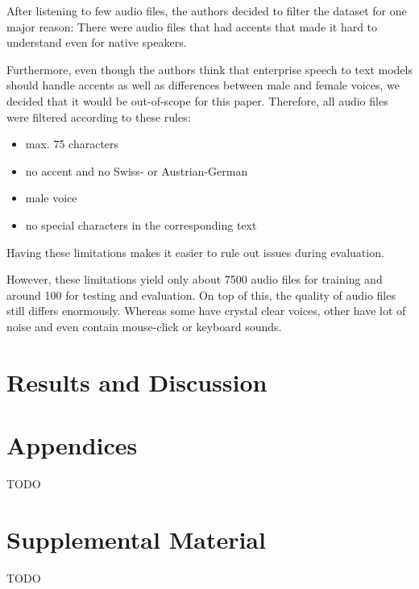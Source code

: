\documentclass[11pt,a4paper]{article}
\begin{document}
After listening to few audio files, the authors decided to filter the dataset for one major reason:
There were audio files that had accents that made it hard to understand even for native speakers.

Furthermore, even though the authors think that enterprise speech to text models
should handle accents as well as differences between male and female voices,
we decided that it would be out-of-scope for this paper.
Therefore, all audio files were filtered according to these rules:

\begin{itemize}
    \item max. 75 characters
    \item no accent and no Swiss- or Austrian-German
    \item male voice
    \item no special characters in the corresponding text
\end{itemize}

Having these limitations makes it easier to rule out issues during evaluation.

However, these limitations yield only about 7500 audio files for training and around 100 for testing and evaluation.  On top of this, the quality of audio files still differs enormously.  Whereas some have crystal clear voices, other have lot of noise and even contain mouse-click or keyboard sounds.


\section{Results and Discussion}





\appendix

\section{Appendices}
TODO

\section{Supplemental Material}
\label{sec:supplemental}
TODO
\end{document}
